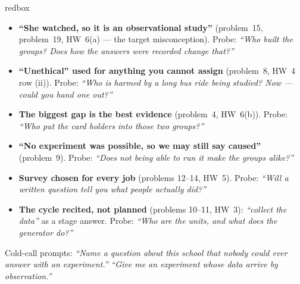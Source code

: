 \documentclass[10pt]{article}
\begin{document}
\boxguard
\begin{skillbox}{redbox}
\begin{itemize}[leftmargin=1.2em, nosep]
  \item \textbf{``She watched, so it is an observational study''} (problem~15, problem~19,
        HW~6(a) --- the target misconception). Probe: \emph{``Who built the groups? Does how
        the answers were recorded change that?''}
  \item \textbf{``Unethical'' used for anything you cannot assign} (problem~8, HW~4 row (ii)).
        Probe: \emph{``Who is harmed by a long bus ride being studied? Now --- could you hand
        one out?''}
  \item \textbf{The biggest gap is the best evidence} (problem~4, HW~6(b)). Probe: \emph{``Who
        put the card holders into those two groups?''}
  \item \textbf{``No experiment was possible, so we may still say caused''} (problem~9). Probe:
        \emph{``Does not being able to run it make the groups alike?''}
  \item \textbf{Survey chosen for every job} (problems 12--14, HW~5). Probe: \emph{``Will a
        written question tell you what people actually did?''}
  \item \textbf{The cycle recited, not planned} (problems 10--11, HW~3): \emph{``collect the
        data''} as a stage answer. Probe: \emph{``Who are the units, and what does the
        generator do?''}
\end{itemize}
Cold-call prompts: \emph{``Name a question about this school that nobody could ever answer with
an experiment.''} \quad \emph{``Give me an experiment whose data arrive by observation.''}
\end{skillbox}
\end{document}
